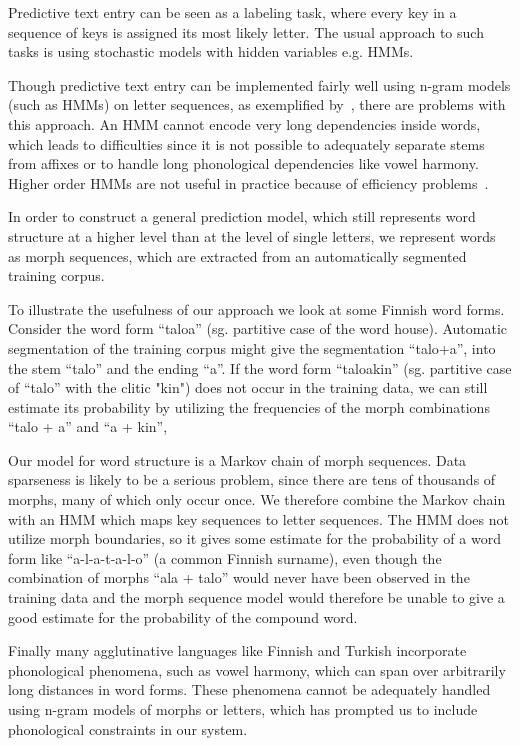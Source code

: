 \documentclass{llncs}
\begin{document}
Predictive text entry can be seen as a labeling task, where every key
in a sequence of keys is assigned its most likely letter. The usual
approach to such tasks is using stochastic models with hidden variables
e.g. HMMs.

Though predictive text entry can be implemented fairly well using
n-gram models (such as HMMs) on letter sequences, as exemplified
by~\cite{Tantug:2010}, there are problems with this approach. An HMM
cannot encode very long dependencies inside words, which leads to
difficulties since it is not possible to adequately separate stems
from affixes or to handle long phonological dependencies like vowel
harmony. Higher order HMMs are not useful in practice because of
efficiency problems~\cite{Tantug:2010}.

In order to construct a general prediction model, which still
represents word structure at a higher level than at the level of
single letters, we represent words as morph sequences, which are
extracted from an automatically segmented training corpus.

To illustrate the usefulness of our approach we look at some Finnish
word forms. Consider the word form ``taloa'' (sg. partitive case of
the word house). Automatic segmentation of the training corpus might
give the segmentation ``talo+a'', into the stem ``talo'' and the ending
``a''. If the word form ``taloakin'' (sg. partitive case of ``talo'' with
the clitic "kin") does not occur in the training data, we can still
estimate its probability by utilizing the frequencies of the morph
combinations ``talo + a'' and ``a + kin'',

Our model for word structure is a Markov chain of morph
sequences. Data sparseness is likely to be a serious problem, since
there are tens of thousands of morphs, many of which only occur
once. We therefore combine the Markov chain with an
HMM which maps key sequences to letter sequences. The HMM does not
utilize morph boundaries, so it gives some estimate for the
probability of a word form like ``a-l-a-t-a-l-o'' (a common Finnish
surname), even though the combination of morphs ``ala + talo'' would never
have been observed in the training data and the morph sequence model
would therefore be unable to give a good estimate for the probability
of the compound word.

Finally many agglutinative languages like Finnish and Turkish
incorporate phonological phenomena, such as vowel harmony, which can
span over arbitrarily long distances in word forms. These phenomena
cannot be adequately handled using n-gram models of morphs or letters,
which has prompted us to include phonological constraints in our
system.
\end{document}
